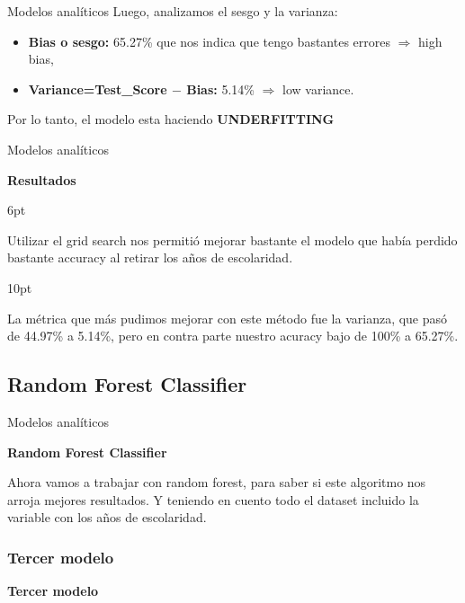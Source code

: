 \documentclass[pdf]{beamer}
\def\vspace{}%
\begin{document}
{\begin{frame}{Modelos analíticos}
    Luego, analizamos el sesgo y la varianza:
    \begin{itemize}
        \item \textbf{Bias o sesgo:} 65.27\% que nos indica que tengo bastantes errores $\Rightarrow$ high bias,
        \item \textbf{Variance=Test\_Score $-$ Bias:} 5.14\%  $\Rightarrow$ low variance.
    \end{itemize}

    Por lo tanto, el modelo esta haciendo \textbf{UNDERFITTING}

\end{frame}

\begin{frame}{Modelos analíticos}

    \begin{Large}
        \textbf{Resultados}
    \end{Large}
    \vspace{6pt}
    
    Utilizar el grid search nos permitió mejorar bastante el modelo que había perdido bastante accuracy al retirar los años de escolaridad. 
    
    \vspace{10pt}
    
    La métrica que más pudimos mejorar con este método fue la varianza, que pasó de 44.97\% a 5.14\%, pero en contra parte nuestro acuracy bajo de 100\% a 65.27\%.

\end{frame}

    \subsection{Random Forest Classifier}

\begin{frame}{Modelos analíticos}

    
    \begin{Large}
        \textbf{Random Forest Classifier}
    \end{Large}

    Ahora vamos a trabajar con random forest, para saber si este algoritmo nos arroja mejores resultados. Y teniendo en cuento todo el dataset incluido la variable con los años de escolaridad. 

    \subsubsection{Tercer modelo}
    \begin{Large}
        \textbf{Tercer modelo}
    \end{Large}


\end{frame}}
\end{document}
